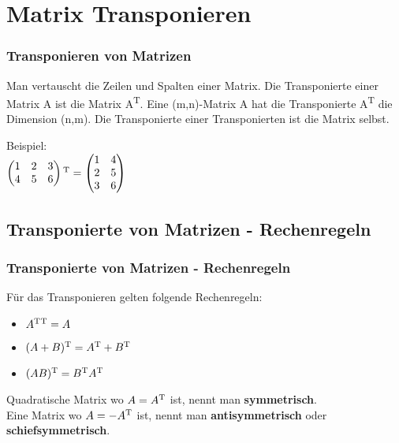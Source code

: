 \section{Matrix Transponieren}
\begin{frame}
\frametitle{Transponieren von Matrizen}
Man vertauscht die Zeilen und Spalten einer Matrix. Die Transponierte einer Matrix A ist die Matrix A\textsuperscript{T}.
Eine (m,n)-Matrix A hat die Transponierte A\textsuperscript{T} die Dimension (n,m). Die Transponierte einer Transponierten ist die Matrix selbst.
\newline

Beispiel:\\
$\begin{pmatrix}
1 & 2 & 3\\
4 & 5 & 6
\end{pmatrix}\textsuperscript{T} = \begin{pmatrix}
1 & 4\\
2 & 5\\
3 & 6
\end{pmatrix}$

\end{frame}

\subsection{Transponierte von Matrizen - Rechenregeln}
\begin{frame}
\frametitle{Transponierte von Matrizen - Rechenregeln}
Für das Transponieren gelten folgende Rechenregeln:
\begin{itemize}
\item $A\textsuperscript{T}\textsuperscript{T} = A$
\item $(A+B)\textsuperscript{T} = A\textsuperscript{T} + B\textsuperscript{T}$
\item $(AB)\textsuperscript{T} = B\textsuperscript{T}A\textsuperscript{T}$
\end{itemize}

Quadratische Matrix wo $A = A\textsuperscript{T}$ ist, nennt man \textbf{symmetrisch}.\\
Eine Matrix wo $A = -A\textsuperscript{T}$ ist, nennt man \textbf{antisymmetrisch} oder \textbf{schiefsymmetrisch}.
\end{frame}

